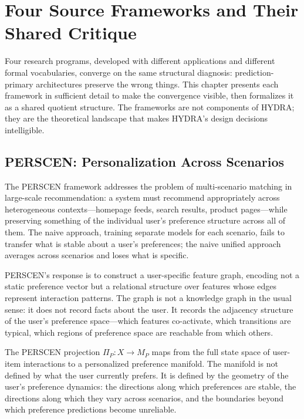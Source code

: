 \documentclass[12pt, oneside]{book}
\theoremstyle{flyxion}
\theoremstyle{definition}
\begin{document}
\chapter{Four Source Frameworks and Their Shared Critique}

Four research programs, developed with different applications and
different formal vocabularies, converge on the same structural
diagnosis: prediction-primary architectures preserve the wrong things.
This chapter presents each framework in sufficient detail to make the
convergence visible, then formalizes it as a shared quotient
structure. The frameworks are not components of HYDRA; they are the
theoretical landscape that makes HYDRA's design decisions intelligible.

\section{PERSCEN: Personalization Across Scenarios}

The PERSCEN framework addresses the problem of multi-scenario matching
in large-scale recommendation: a system must recommend appropriately
across heterogeneous contexts---homepage feeds, search results, product
pages---while preserving something of the individual user's preference
structure across all of them. The naive approach, training separate
models for each scenario, fails to transfer what is stable about a
user's preferences; the naive unified approach averages across scenarios
and loses what is specific.

PERSCEN's response is to construct a user-specific feature graph,
encoding not a static preference vector but a relational structure over
features whose edges represent interaction patterns. The graph is not
a knowledge graph in the usual sense: it does not record facts about
the user. It records the adjacency structure of the user's preference
space---which features co-activate, which transitions are typical,
which regions of preference space are reachable from which others.

The PERSCEN projection $\Pi_P : X \to M_P$ maps from the full state
space of user-item interactions to a personalized preference manifold.
The manifold is not defined by what the user currently prefers. It is
defined by the geometry of the user's preference dynamics: the
directions along which preferences are stable, the directions along
which they vary across scenarios, and the boundaries beyond which
preference predictions become unreliable.
\end{document}
